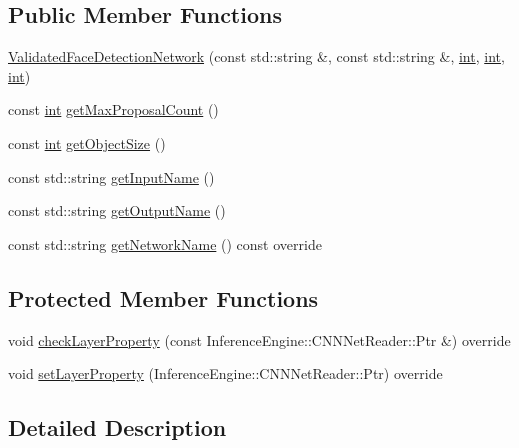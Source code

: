 \subsection*{Public Member Functions}
\begin{DoxyCompactItemize}
\item 
\hyperlink{classValidatedFaceDetectionNetwork_ace6a0ade3b55b8ad9da95b1176816de0}{Validated\+Face\+Detection\+Network} (const std\+::string \&, const std\+::string \&, \hyperlink{CMakeCache_8txt_a79a3d8790b2588b09777910863574e09}{int}, \hyperlink{CMakeCache_8txt_a79a3d8790b2588b09777910863574e09}{int}, \hyperlink{CMakeCache_8txt_a79a3d8790b2588b09777910863574e09}{int})
\item 
const \hyperlink{CMakeCache_8txt_a79a3d8790b2588b09777910863574e09}{int} \hyperlink{classValidatedFaceDetectionNetwork_a994965fa17987321fe0be18f36edf64f}{get\+Max\+Proposal\+Count} ()
\item 
const \hyperlink{CMakeCache_8txt_a79a3d8790b2588b09777910863574e09}{int} \hyperlink{classValidatedFaceDetectionNetwork_aedb5789b8c86e77a58ba154907b049bb}{get\+Object\+Size} ()
\item 
const std\+::string \hyperlink{classValidatedFaceDetectionNetwork_a9cae6cfaf2582394ed57ea0b68af55fd}{get\+Input\+Name} ()
\item 
const std\+::string \hyperlink{classValidatedFaceDetectionNetwork_a076d4b58f4eeac4ffde6b8dc675457a3}{get\+Output\+Name} ()
\item 
const std\+::string \hyperlink{classValidatedFaceDetectionNetwork_aecbdd3b338b04f78b6c7bab6db8a9b84}{get\+Network\+Name} () const override
\end{DoxyCompactItemize}
\subsection*{Protected Member Functions}
\begin{DoxyCompactItemize}
\item 
void \hyperlink{classValidatedFaceDetectionNetwork_a11fa93d64058521c37940196ed29fddc}{check\+Layer\+Property} (const Inference\+Engine\+::\+C\+N\+N\+Net\+Reader\+::\+Ptr \&) override
\item 
void \hyperlink{classValidatedFaceDetectionNetwork_ac24b2e9e36a06c4f9a8db5bf1aa7a8c7}{set\+Layer\+Property} (Inference\+Engine\+::\+C\+N\+N\+Net\+Reader\+::\+Ptr) override
\end{DoxyCompactItemize}


\subsection{Detailed Description}



